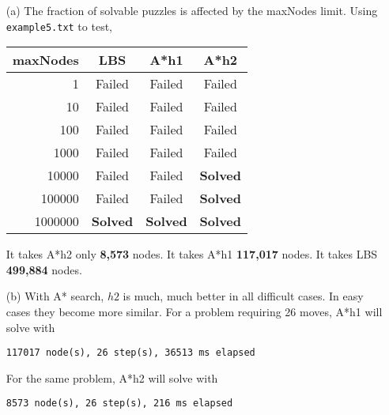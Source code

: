 \documentclass[letterpaper]{article}
\begin{document}
\begin{itemize}
    \item[(a)]
    The fraction of solvable puzzles is affected by the maxNodes limit.
    Using \texttt{example5.txt} to test,

    \begin{tabular}{| r | c | c | c |}
      \hline
      maxNodes & LBS & A*h1 & A*h2 \\
      \hline\hline
      1 & Failed & Failed & Failed \\
      \hline
      10 & Failed & Failed & Failed \\
      \hline
      100 & Failed & Failed & Failed \\
      \hline
      1000 & Failed & Failed & Failed \\
      \hline
      10000 & Failed & Failed & \textbf{Solved} \\
      \hline
      100000 & Failed & Failed & \textbf{Solved} \\
      \hline
      1000000 & \textbf{Solved} & \textbf{Solved} & \textbf{Solved} \\
      \hline  
    \end{tabular}

    It takes A*h2 only \textbf{8,573} nodes. It takes A*h1 \textbf{117,017} nodes. It takes LBS
    \textbf{499,884} nodes.
    \item[(b)]
    With A* search, $h2$ is much, much better in all difficult cases. In easy cases they become more
    similar.
    For a problem requiring 26 moves, A*h1 will solve with
    
    \texttt{117017 node(s), 26 step(s), 36513 ms elapsed}

    For the same problem, A*h2 will solve with

    \texttt{8573 node(s), 26 step(s), 216 ms elapsed}


\end{itemize}
\end{document}
